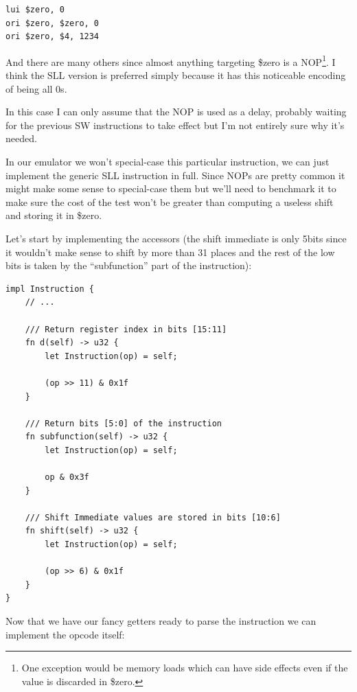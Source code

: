 \documentclass[a4paper]{article}
\begin{document}
\begin{lstlisting}[language=assembly]
lui $zero, 0
ori $zero, $zero, 0
ori $zero, $4, 1234
\end{lstlisting}

And there are many others since almost anything targeting \$zero is a
NOP\footnote{One exception would be memory loads which can have side
  effects even if the value is discarded in \$zero.}. I think the SLL
version is preferred simply because it has this noticeable encoding of
being all 0s.

In this case I can only assume that the NOP is used as a delay,
probably waiting for the previous SW instructions to take effect but
I'm not entirely sure why it's needed.

In our emulator we won't special-case this particular instruction, we
can just implement the generic SLL instruction in full. Since NOPs are
pretty common it might make some sense to special-case them but we'll
need to benchmark it to make sure the cost of the test won't be
greater than computing a useless shift and storing it in \$zero.

Let's start by implementing the accessors (the shift immediate is only
5bits since it wouldn't make sense to shift by more than 31 places and
the rest of the low bits is taken by the ``subfunction'' part of the
instruction):

\begin{lstlisting}
impl Instruction {
    // ...

    /// Return register index in bits [15:11]
    fn d(self) -> u32 {
        let Instruction(op) = self;

        (op >> 11) & 0x1f
    }

    /// Return bits [5:0] of the instruction
    fn subfunction(self) -> u32 {
        let Instruction(op) = self;

        op & 0x3f
    }

    /// Shift Immediate values are stored in bits [10:6]
    fn shift(self) -> u32 {
        let Instruction(op) = self;

        (op >> 6) & 0x1f
    }
}
\end{lstlisting}

Now that we have our fancy getters ready to parse the instruction we
can implement the opcode itself:
\end{document}
